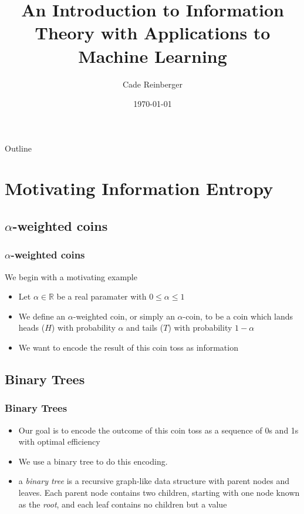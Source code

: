 \documentclass[xcolor=dvipsnames]{beamer}
\title{An Introduction to Information Theory with Applications to Machine Learning}
\date{\today}
\author[Cade]{Cade Reinberger}
\institute[CSH]{RIT Computer Science House}
\begin{document}
	
	\begin{frame}
		\titlepage
	\end{frame}
	
	\begin{frame}{Outline}
		\tableofcontents
	\end{frame}
	
	\section{Motivating Information Entropy}
	
	\subsection{$\alpha$-weighted coins}
	\begin{frame}
	    \frametitle{$\alpha$-weighted coins}
		We begin with a motivating example
		\begin{itemize}
			\item Let $\alpha \in \mathbb{R}$ be a real paramater with $0 \leq \alpha \leq 1$
			\pause
			\item We define an $\alpha$-weighted coin, or simply an $\alpha$-coin, to be a coin which lands heads ($H$) with probability $\alpha$ and tails ($T$) with probability $1 - \alpha$
			\pause
			\item We want to encode the result of this coin toss as information
		\end{itemize}
	\end{frame}
	
	\subsection{Binary Trees}
	\begin{frame}
	    \frametitle{Binary Trees}
		\begin{itemize}
			\item Our goal is to encode the outcome of this coin toss as a sequence of 0s and 1s with optimal efficiency
			\pause
			\item We use a binary tree to do this encoding. 
			\pause
			\item a \textit{binary tree} is a recursive graph-like data structure with parent nodes and leaves. Each parent node contains two children, starting with one node known as the \textit{root}, and each leaf contains no children but a value
		\end{itemize}
	\end{frame}
	
\end{document}
